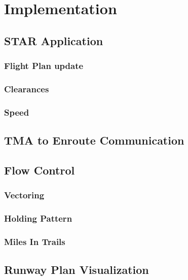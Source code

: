 \chapter{Implementation}

\section{STAR Application}
\subsection{Flight Plan update}
\subsection{Clearances}
\subsection{Speed}

\section{TMA to Enroute Communication}

\section{Flow Control}
\subsection{Vectoring}
\subsection{Holding Pattern}
\subsection{Miles In Trails}

\section{Runway Plan Visualization}




